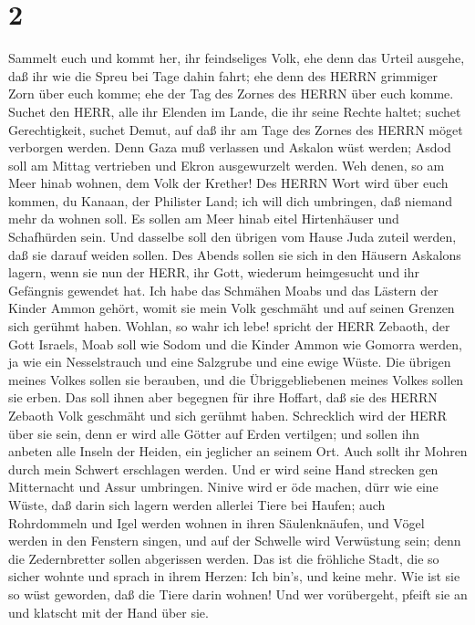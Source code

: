 \hypertarget{section-1}{%
\section{2}\label{section-1}}

 Sammelt euch und kommt her, ihr feindseliges Volk,
 ehe denn das Urteil ausgehe, daß ihr wie die Spreu bei Tage
dahin fahrt; ehe denn des HERRN grimmiger Zorn über euch komme; ehe der
Tag des Zornes des HERRN über euch komme.  Suchet den HERR,
alle ihr Elenden im Lande, die ihr seine Rechte haltet; suchet
Gerechtigkeit, suchet Demut, auf daß ihr am Tage des Zornes des HERRN
möget verborgen werden.  Denn Gaza muß verlassen und Askalon
wüst werden; Asdod soll am Mittag vertrieben und Ekron ausgewurzelt
werden.  Weh denen, so am Meer hinab wohnen, dem Volk der
Krether! Des HERRN Wort wird über euch kommen, du Kanaan, der Philister
Land; ich will dich umbringen, daß niemand mehr da wohnen soll.
 Es sollen am Meer hinab eitel Hirtenhäuser und Schafhürden
sein.  Und dasselbe soll den übrigen vom Hause Juda zuteil
werden, daß sie darauf weiden sollen. Des Abends sollen sie sich in den
Häusern Askalons lagern, wenn sie nun der HERR, ihr Gott, wiederum
heimgesucht und ihr Gefängnis gewendet hat.  Ich habe das
Schmähen Moabs und das Lästern der Kinder Ammon gehört, womit sie mein
Volk geschmäht und auf seinen Grenzen sich gerühmt haben. 
Wohlan, so wahr ich lebe! spricht der HERR Zebaoth, der Gott Israels,
Moab soll wie Sodom und die Kinder Ammon wie Gomorra werden, ja wie ein
Nesselstrauch und eine Salzgrube und eine ewige Wüste. Die übrigen
meines Volkes sollen sie berauben, und die Übriggebliebenen meines
Volkes sollen sie erben.  Das soll ihnen aber begegnen für
ihre Hoffart, daß sie des HERRN Zebaoth Volk geschmäht und sich gerühmt
haben.  Schrecklich wird der HERR über sie sein, denn er
wird alle Götter auf Erden vertilgen; und sollen ihn anbeten alle Inseln
der Heiden, ein jeglicher an seinem Ort.  Auch sollt ihr
Mohren durch mein Schwert erschlagen werden.  Und er wird
seine Hand strecken gen Mitternacht und Assur umbringen. Ninive wird er
öde machen, dürr wie eine Wüste,  daß darin sich lagern
werden allerlei Tiere bei Haufen; auch Rohrdommeln und Igel werden
wohnen in ihren Säulenknäufen, und Vögel werden in den Fenstern singen,
und auf der Schwelle wird Verwüstung sein; denn die Zedernbretter sollen
abgerissen werden.  Das ist die fröhliche Stadt, die so
sicher wohnte und sprach in ihrem Herzen: Ich bin's, und keine mehr. Wie
ist sie so wüst geworden, daß die Tiere darin wohnen! Und wer
vorübergeht, pfeift sie an und klatscht mit der Hand über sie.

